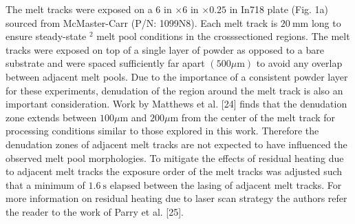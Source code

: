 \documentclass[10pt]{article}
\begin{document}
The melt tracks were exposed on a 6 in $\times 6$ in $\times 0.25$ in In718 plate (Fig. 1a) sourced from McMaster-Carr (P/N: 1099N8). Each melt track is $20 \mathrm{~mm}$ long to ensure steady-state ${ }^{2}$ melt pool conditions in the crosssectioned regions. The melt tracks were exposed on top of a single layer of powder as opposed to a bare substrate and were spaced sufficiently far apart $(500 \mu \mathrm{m})$ to avoid any overlap between adjacent melt pools. Due to the importance of a consistent powder layer for these experiments, denudation of the region around the melt track is also an important consideration. Work by Matthews et al. [24] finds that the denudation zone extends between $100 \mu \mathrm{m}$ and $200 \mu \mathrm{m}$ from the center of the melt track for processing conditions similar to those explored in this work. Therefore the denudation zones of adjacent melt tracks are not expected to have influenced the observed melt pool morphologies. To mitigate the effects of residual heating due to adjacent melt tracks the exposure order of the melt tracks was adjusted such that a minimum of $1.6 \mathrm{~s}$ elapsed between the lasing of adjacent melt tracks. For more information on residual heating due to laser scan strategy the authors refer the reader to the work of Parry et al. [25].
\end{document}
